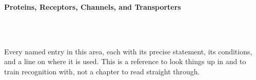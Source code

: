 



\makeindex[title={Index of This Volume},columns=2,intoc]

\begin{titlepage}\thispagestyle{empty}
\vspace*{0.14\textheight}
\noindent{\color{tiercat}\rule{\textwidth}{5pt}}\\[3pt]
\noindent{\color{bioline}\rule{\textwidth}{1pt}}\\[26pt]
\\[12pt]
\noindent\begin{minipage}{\textwidth}\raggedright
{\sffamily\bfseries\fontsize{28}{32}\selectfont\color{bioink}%
 \hyphenchar{} Proteins, Receptors, Channels, and Transporters\par}\end{minipage}\\[16pt]
\noindent{\color{biogreen}\rule{\textwidth}{1.4pt}}\\[10pt]
\noindent\begin{minipage}{\textwidth}\raggedright
{\fontsize{10.5}{14}\selectfont\color{biogreen}%
Every named entry in this area, each with its precise statement, its conditions, and a line on
where it is used. This is a reference to look things up in and to train recognition with, not a
chapter to read straight through.\par}\end{minipage}
\vfill
\noindent{\color{bioline}\rule{\textwidth}{1pt}}\\[3pt]
\noindent{\color{tiercat}\rule{\textwidth}{5pt}}
\end{titlepage}
\tableofcontents
\clearpage
{}
\clearpage
\printindex

